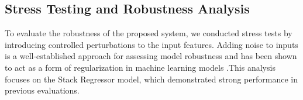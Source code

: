 \documentclass[11pt]{article}
\begin{document}






\subsection{Stress Testing and Robustness Analysis}

To evaluate the robustness of the proposed system, we conducted stress tests by introducing controlled perturbations to the input features. Adding noise to inputs is a well-established approach for assessing model robustness and has been shown to act as a form of regularization in machine learning models \citep{bishop1995training}.This analysis focuses on the Stack Regressor model, which demonstrated strong performance in previous evaluations.
\end{document}
